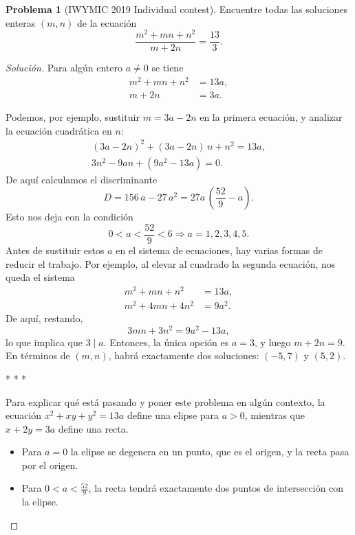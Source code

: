 \documentclass{article}
\theoremstyle{definition}
\newtheorem{problema}{Problema}
\newenvironment{solucion}{\begin{proof}[Solución]}{\end{proof}}
\begin{document}
\begin{problema}[IWYMIC 2019 Individual contest]
  Encuentre todas las soluciones enteras $(m,n)$ de la ecuación
  $$\frac{m^2 + mn + n^2}{m + 2n} = \frac{13}{3}.$$

  \ifdefined\solutions\begin{solucion}
    Para algún entero $a\ne 0$ se tiene
    \begin{align*}
      m^2 + mn + n^2 & = 13 a, \\
      m + 2n & = 3 a.
    \end{align*}

    Podemos, por ejemplo, sustituir $m = 3a - 2n$ en la primera ecuación, y
    analizar la ecuación cuadrática en $n$:
    \begin{gather*}
      (3a - 2n)^2 + (3a - 2n)\,n + n^2 = 13 a, \\
      3n^2 - 9an + (9a^2 - 13a) = 0.
    \end{gather*}
    De aquí calculamos el discriminante
    $$D = 156\,a - 27\,a^2 = 27a\,\left(\frac{52}{9} - a\right).$$
    Esto nos deja con la condición
    $$0 < a < \frac{52}{9} < 6 \Longrightarrow a = 1,2,3,4,5.$$
    Antes de sustituir estos $a$ en el sistema de ecuaciones, hay varias formas
    de reducir el trabajo. Por ejemplo, al elevar al cuadrado la segunda
    ecuación, nos queda el sistema
    \begin{align*}
      m^2 + mn + n^2 & = 13 a, \\
      m^2 + 4mn + 4n^2 & = 9 a^2.
    \end{align*}
    De aquí, restando,
    $$3mn + 3n^2 = 9a^2 - 13a,$$
    lo que implica que $3 \mid a$. Entonces, la única opción es $a = 3$, y luego
    $m + 2n = 9$. En términos de $(m,n)$, habrá exactamente dos soluciones:
    $(-5,7)$ y $(5,2)$.

    \begin{center}
      * * *
    \end{center}

    Para explicar qué está pasando y poner este problema en algún contexto,
    la ecuación $x^2 + xy + y^2 = 13 a$ define una elipse para $a > 0$, mientras
    que $x + 2y = 3 a$ define una recta.

    \begin{itemize}
    \item Para $a = 0$ la elipse se degenera en un punto, que es el origen, y la
      recta pasa por el origen.

    \item Para $0 < a < \frac{52}{9}$, la recta tendrá exactamente dos puntos de
      intersección con la elipse.


\end{itemize}
\end{solucion}
\end{problema}
\end{document}
